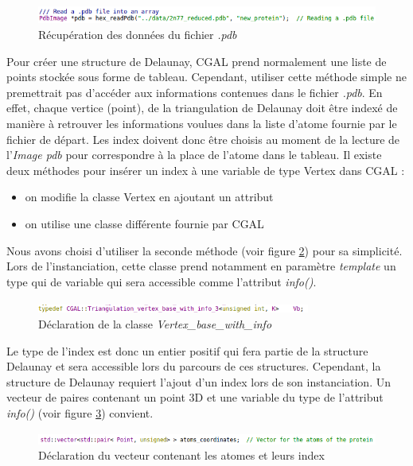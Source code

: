 \begin{figure}[ht]
\centering
  \includegraphics[width=\textwidth]{figures/pdb_image.png}
  \caption{Récupération des données du fichier \textit{.pdb}}
  \label{fig::read_pdb}
\end{figure}

Pour créer une structure de Delaunay, CGAL prend normalement une liste de points stockée
sous forme de tableau. Cependant, utiliser cette méthode simple ne premettrait pas d'accéder aux
informations contenues dans le fichier \textit{.pdb}. En effet, chaque vertice (point), de la
triangulation de Delaunay doit être indexé de manière à retrouver les informations voulues dans la
liste d'atome fournie par le fichier de départ. Les index doivent donc être choisis
au moment de la lecture de l'\textit{Image pdb} pour correspondre à la place de l'atome
dans le tableau.
Il existe deux méthodes pour insérer un index à une variable de type Vertex dans CGAL :
\begin{itemize}
  \item on modifie la classe Vertex en ajoutant un attribut
  \item on utilise une classe différente fournie par CGAL
\end{itemize}
Nous avons choisi d'utiliser la seconde méthode (voir figure \ref{fig::vertex_base}) pour
sa simplicité. Lors de l'instanciation, cette classe prend notamment en paramètre
\textit{template} un type qui de variable qui sera accessible comme l'attribut \textit{info()}.

\begin{figure}[ht]
\centering
  \includegraphics[width=0.8\textwidth]{figures/vertex_base.png}
  \caption{Déclaration de la classe \textit{Vertex\_base\_with\_info}}
  \label{fig::vertex_base}
\end{figure}

Le type de l'index est donc un entier positif qui fera partie de la structure Delaunay
et sera accessible lors du parcours de ces structures. Cependant, la structure de Delaunay
requiert l'ajout d'un index lors de son instanciation. Un vecteur de paires contenant
un point 3D et une variable du type de l'attribut \textit{info()} (voir figure
\ref{fig::vector_atom_index}) convient.

\begin{figure}[ht]
\centering
  \includegraphics[width=\textwidth]{figures/vector_atom_index.png}
  \caption{Déclaration du vecteur contenant les atomes et leurs index}
  \label{fig::vector_atom_index}
\end{figure}

